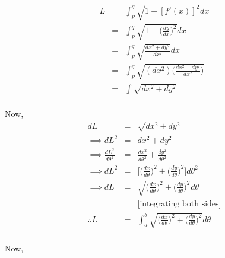 \documentclass{article}
\begin{document}
\subsection{}%
\large{
\begin{eqnarray*}
    L &=& \int_p^q\sqrt{1+[f'(x)]^2}dx\\
      &=& \int_p^q\sqrt{1+\Bigg(\frac{dy}{dx}\Bigg)^2}dx\\ 
      &=& \int_p^q \sqrt{\frac{dx^2+dy^2}{dx^2}}dx\\
      &=& \int_p^q \sqrt{(dx^2)\Bigg(\frac{dx^2+dy^2}{dx^2}\Bigg)}\\
      &=& \int\sqrt{dx^2+dy^2}\\
\end{eqnarray*}

Now,
\begin{eqnarray*}
    dL &=& \sqrt{dx^2+dy^2}\\
    \implies dL^2 &=& dx^2+dy^2\\
    \implies\frac{dL^2}{d\theta^2} &=& \frac{dx^2}{d\theta ^2}+\frac{dy^2}{d\theta^2}\\
    \implies dL^2 &=& \Bigg[\Bigg(\frac{dx}{d\theta}\Bigg)^2+\Bigg(\frac{dy}{d\theta}\Bigg)^2\Bigg]d\theta ^2\\
    \implies dL &=& \sqrt{\Bigg(\frac{dx}{d\theta}\Bigg)^2+\Bigg(\frac{dy}{d\theta}\Bigg)^2}d\theta\\
                &&\text{[integrating both sides]}\\
    \therefore L &=& \int_a^b \sqrt{\Bigg(\frac{dx}{d\theta}\Bigg)^2+\Bigg(\frac{dy}{d\theta}\Bigg)^2}d\theta\\
\end{eqnarray*}

\newpage
Now,

}
\end{document}
